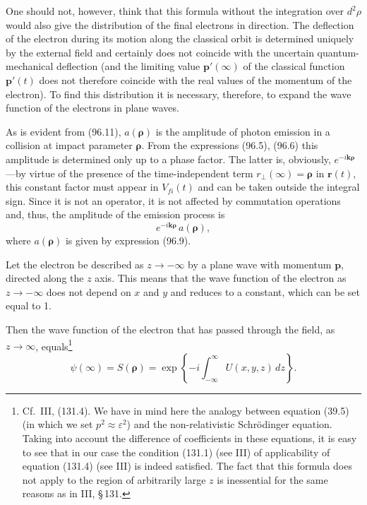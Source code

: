One should not, however, think that this formula without the integration over $d^2\rho$ would also give the distribution of the final electrons in direction. The deflection of the electron during its motion along the classical orbit is determined uniquely by the external field and certainly does not coincide with the uncertain quantum-mechanical deflection (and the limiting value $\mathbf{p}'(\infty)$ of the classical function $\mathbf{p}'(t)$ does not therefore coincide with the real values of the momentum of the electron). To find this distribution it is necessary, therefore, to expand the wave function of the electrons in plane waves.

As is evident from (96.11), $a(\boldsymbol{\rho})$ is the amplitude of photon emission in a collision at impact parameter $\boldsymbol{\rho}$. From the expressions (96.5), (96.6) this amplitude is determined only up to a phase factor. The latter is, obviously, $e^{-i\mathbf{k}\boldsymbol{\rho}}$---by virtue of the presence of the time-independent term $r_\perp(\infty) = \boldsymbol{\rho}$ in $\mathbf{r}(t)$, this constant factor must appear in $V_{fi}(t)$ and can be taken outside the integral sign. Since it is not an operator, it is not affected by commutation operations and, thus, the amplitude of the emission process is
\begin{equation}
e^{-i\mathbf{k}\boldsymbol{\rho}}\,a(\boldsymbol{\rho}),
\label{eq:96.12}
\end{equation}
where $a(\boldsymbol{\rho})$ is given by expression (96.9).

Let the electron be described as $z \to -\infty$ by a plane wave with momentum $\mathbf{p}$, directed along the $z$ axis. This means that the wave function of the electron as $z \to -\infty$ does not depend on $x$ and $y$ and reduces to a constant, which can be set equal to 1.


Then the wave function of the electron that has passed through the field, as $z \to \infty$, equals\footnote{Cf.\ III, (131.4). We have in mind here the analogy between equation (39.5) (in which we set $p^2 \approx \varepsilon^2$) and the non-relativistic Schr\"{o}dinger equation. Taking into account the difference of coefficients in these equations, it is easy to see that in our case the condition (131.1) (see III) of applicability of equation (131.4) (see III) is indeed satisfied. The fact that this formula does not apply to the region of arbitrarily large $z$ is inessential for the same reasons as in III, \S\,131.}
\begin{equation}
\psi(\infty) = S(\boldsymbol{\rho}) = \exp\!\left\{-i\int_{-\infty}^{\infty}U(x,y,z)\,dz\right\}.
\label{eq:96.13}
\end{equation}

